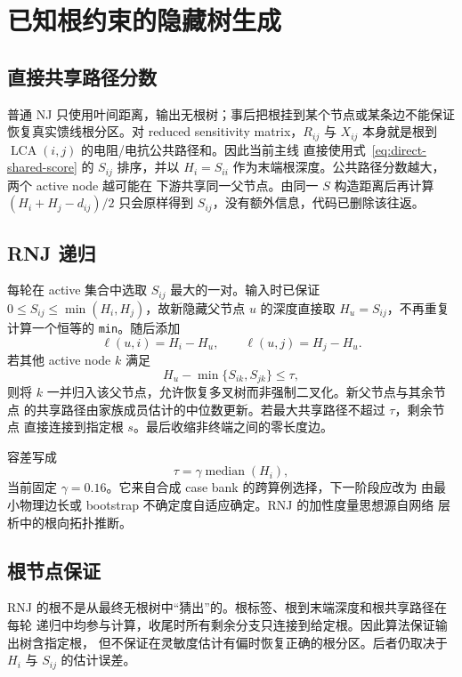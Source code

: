 \section{已知根约束的隐藏树生成}

\subsection{直接共享路径分数}

普通 NJ 只使用叶间距离，输出无根树；事后把根挂到某个节点或某条边不能保证
恢复真实馈线根分区。对 reduced sensitivity matrix，$R_{ij}$ 与 $X_{ij}$
本身就是根到 $\operatorname{LCA}(i,j)$ 的电阻/电抗公共路径和。因此当前主线
直接使用式~\eqref{eq:direct-shared-score} 的 $S_{ij}$ 排序，并以
$H_i=S_{ii}$ 作为末端根深度。公共路径分数越大，两个 active node 越可能在
下游共享同一父节点。由同一 $S$ 构造距离后再计算
$(H_i+H_j-d_{ij})/2$ 只会原样得到 $S_{ij}$，没有额外信息，代码已删除该往返。

\subsection{RNJ 递归}

每轮在 active 集合中选取 $S_{ij}$ 最大的一对。输入时已保证
$0\le S_{ij}\le\min(H_i,H_j)$，故新隐藏父节点 $u$ 的深度直接取
$H_u=S_{ij}$，不再重复计算一个恒等的 \texttt{min}。随后添加
\[
\ell(u,i)=H_i-H_u,\qquad \ell(u,j)=H_j-H_u.
\]
若其他 active node $k$ 满足
\begin{equation}
  H_u-\min\{S_{ik},S_{jk}\}\le \tau,
\end{equation}
则将 $k$ 一并归入该父节点，允许恢复多叉树而非强制二叉化。新父节点与其余节点
的共享路径由家族成员估计的中位数更新。若最大共享路径不超过 $\tau$，剩余节点
直接连接到指定根 $s$。最后收缩非终端之间的零长度边。

容差写成
\begin{equation}
  \tau=\gamma\operatorname{median}(H_i),
\end{equation}
当前固定 $\gamma=0.16$。它来自合成 case bank 的跨算例选择，下一阶段应改为
由最小物理边长或 bootstrap 不确定度自适应确定。RNJ 的加性度量思想源自网络
层析中的根向拓扑推断\cite{ni2010,ni2011}。

\subsection{根节点保证}

RNJ 的根不是从最终无根树中“猜出”的。根标签、根到末端深度和根共享路径在每轮
递归中均参与计算，收尾时所有剩余分支只连接到给定根。因此算法保证输出树含指定根，
但不保证在灵敏度估计有偏时恢复正确的根分区。后者仍取决于 $H_i$ 与 $S_{ij}$ 的估计误差。

